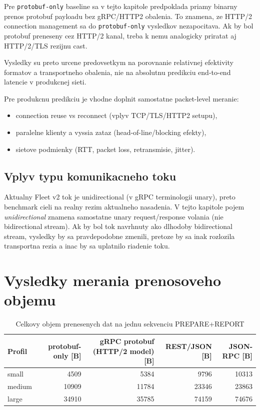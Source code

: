 \documentclass[12pt,a4paper]{report}
\begin{document}
Pre \texttt{protobuf-only} baseline sa v tejto kapitole predpoklada
priamy binarny prenos protobuf payloadu bez gRPC/HTTP2 obalenia.
To znamena, ze HTTP/2 connection management sa do \texttt{protobuf-only}
vysledkov nezapocitava. Ak by bol protobuf preneseny cez HTTP/2 kanal,
treba k nemu analogicky priratat aj HTTP/2/TLS rezijnu cast.

Vysledky su preto urcene predovsetkym na porovnanie relativnej efektivity
formatov a transportneho obalenia, nie na absolutnu predikciu end-to-end
latencie v produkcnej sieti.

Pre produkcnu predikciu je vhodne doplnit samostatne packet-level meranie:
\begin{itemize}
  \item connection reuse vs reconnect (vplyv TCP/TLS/HTTP2 setupu),
  \item paralelne klienty a vyssia zataz (head-of-line/blocking efekty),
  \item sietove podmienky (RTT, packet loss, retransmisie, jitter).
\end{itemize}

\subsection{Vplyv typu komunikacneho toku}

Aktualny Fleet v2 tok je unidirectional (v gRPC terminologii unary),
preto benchmark cieli na realny rezim aktualneho nasadenia.
V tejto kapitole pojem \textit{unidirectional} znamena samostatne unary
request/response volania (nie bidirectional stream).
Ak by bol tok navrhnuty ako dlhodoby bidirectional stream, vysledky by sa
pravdepodobne zmenili, pretoze by sa inak rozlozila transportna rezia
a inac by sa uplatnilo riadenie toku.

\section{Vysledky merania prenosoveho objemu}

\begin{table}[htbp]
\centering
\caption{Celkovy objem prenesenych dat na jednu sekvenciu PREPARE+REPORT}
\label{tab:transport-bytes-profile}
\begin{tabular}{|l|r|r|r|r|}
\hline
Profil & protobuf-only [B] & gRPC protobuf (HTTP/2 model) [B] & REST/JSON [B] & JSON-RPC [B] \\
\hline
small  & 4509  & 5384  & 9796  & 10313 \\
medium & 10909 & 11784 & 23346 & 23863 \\
large  & 34910 & 35785 & 74159 & 74676 \\
\hline
\end{tabular}
\end{table}
\end{document}
